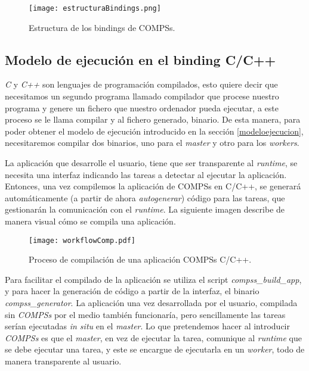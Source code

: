 \begin{figure}[H]
    \centering 
    \caption{Estructura de los bindings de COMPSs.}
    \texttt{[image: estructuraBindings.png]}
    \label{fig:estructurabindings}
\end{figure}

\subsection{Modelo de ejecución en el binding C/C++}
\label{sec:bindings}

\textit{C} y \textit{C++} son lenguajes de programación compilados, esto quiere decir que necesitamos un segundo programa llamado compilador que procese nuestro programa y genere un fichero que nuestro ordenador pueda ejecutar, a este proceso se le llama compilar y al fichero generado, binario. De esta manera, para poder obtener el modelo de ejecución introducido en la sección \ref{modeloejecucion}, necesitaremos compilar dos binarios, uno para el \textit{master} y otro para los \textit{workers}.
\par\bigskip

\begin{comment}
La aplicación que desarrolla el usuario, \textit{a priori} no envía las tareas a ejecutar ni las dependencias entre estas, no gestiona el \textit{runtime}, pero es desarrollada siguiendo unas directrices que nos permitirán generar código que sí gestione todo lo que es necesario con tal de que la aplicación se distribuya correctamente. 
\end{comment}

La aplicación que desarrolle el usuario, tiene que ser transparente al \textit{runtime}, se necesita una interfaz indicando las tareas a detectar al ejecutar la aplicación. Entonces, una vez compilemos la aplicación de COMPSs en C/C++, se generará automáticamente (a partir de ahora \textit{autogenerar}) código para las tareas, que gestionarán la comunicación con el \textit{runtime}.
\smallskip
La siguiente imagen describe de manera visual cómo se compila una aplicación. 

\begin{figure}[H]
    \centering 
    \caption{Proceso de compilación de una aplicación COMPSs C/C++.}
    \texttt{[image: workflowComp.pdf]}
    \label{fig:workflowcompilado}
\end{figure}

\par\bigskip
Para facilitar el compilado de la aplicación se utiliza el script \textit{compss\_build\_app}, y para hacer la generación de código a partir de la interfaz, el binario \textit{compss\_generator}.
La aplicación una vez desarrollada por el usuario, compilada sin \textit{COMPSs} por el medio también funcionaría, pero sencillamente las tareas serían ejecutadas \textit{in situ} en el \textit{master}.  Lo que pretendemos hacer al introducir \textit{COMPSs} es que el \textit{master}, en vez de ejecutar la tarea, comunique al \textit{runtime} que se debe ejecutar una tarea, y este se encargue de ejecutarla en un \textit{worker}, todo de manera transparente al usuario.
\par\bigskip

